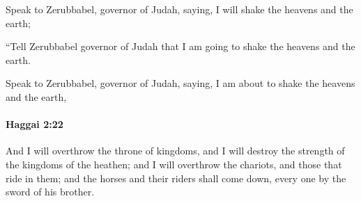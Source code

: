 			\begin{versebox}
					\item[BHS] 
					\item[LXX] 
					\item[ASV] Speak to Zerubbabel, governor of Judah, saying, I will shake the heavens and the earth;
					\item[NIV] “Tell Zerubbabel governor of Judah that I am going to shake the heavens and the earth.
					\item[NRSV] Speak to Zerubbabel, governor of Judah, saying, I am about to shake the heavens and the earth,
			\end{versebox}

		\paragraph{Haggai 2:22} %
			\label{HAGGAI-2-22}

			And I will overthrow the throne of kingdoms, and I will destroy the strength of the kingdoms of the heathen; and I will overthrow the chariots, and those that ride in them; and the horses and their riders shall come down, every one by the sword of his brother.

